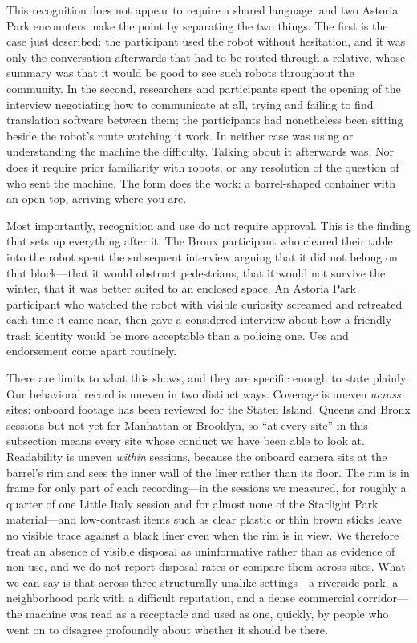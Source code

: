 This recognition does not appear to require a shared language, and two Astoria
Park encounters make the point by separating the two things. The first is the
case just described: the participant used the robot without hesitation, and it
was only the conversation afterwards that had to be routed through a relative,
whose summary was that it would be good to see such robots throughout the
community. In the second, researchers and
participants spent the opening of the interview negotiating how to communicate at
all, trying and failing to find translation software between them; the
participants had nonetheless been sitting beside the robot's route watching it
work. In neither case was using or understanding the machine the difficulty.
Talking about it afterwards was. Nor does it
require prior familiarity with robots, or any resolution of the question of who
sent the machine. The form does the work: a barrel-shaped container with an open
top, arriving where you are.

Most importantly, recognition and use do not require approval. This is the
finding that sets up everything after it. The Bronx participant who cleared their
table into the robot spent the subsequent interview arguing that it did not
belong on that block---that it would obstruct pedestrians, that it would not
survive the winter, that it was better suited to an enclosed space. An Astoria
Park participant who watched the robot with visible curiosity screamed and
retreated each time it came near, then gave a considered interview about how a
friendly trash identity would be more acceptable than a policing one. Use and
endorsement come apart routinely.

There are limits to what this shows, and they are specific enough to state
plainly. Our behavioral record is uneven in two distinct ways. Coverage is uneven
\emph{across} sites: onboard footage has been reviewed for the Staten Island,
Queens and Bronx sessions but not yet for Manhattan or Brooklyn, so ``at every
site'' in this subsection means every site whose conduct we have been able to
look at. Readability is uneven \emph{within} sessions, because the onboard camera
sits at the barrel's rim and sees the inner wall of the liner rather than its
floor. The rim is in frame for only part of each recording---in the sessions we
measured, for roughly a quarter of one Little Italy session and for almost none
of the Starlight Park material---and low-contrast items such as clear plastic or
thin brown sticks leave no visible trace against a black liner even when the rim
is in view. We therefore treat an absence of visible disposal as uninformative
rather than as evidence of non-use, and we do not report disposal rates or
compare them across sites. What we can say is that across three structurally
unalike settings---a riverside park, a neighborhood park with a difficult
reputation, and a dense commercial corridor---the machine was read as a
receptacle and used as one, quickly, by people who went on to disagree profoundly
about whether it should be there.

